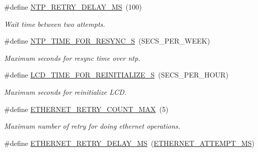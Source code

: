 \begin{DoxyCompactItemize}
\mbox{\label{rmap-config_8h_aee0934e91270bda3cc3fcaa9082fadc8}} 
\#define \hyperlink{rmap-config_8h_aee0934e91270bda3cc3fcaa9082fadc8}{N\+T\+P\+\_\+\+R\+E\+T\+R\+Y\+\_\+\+D\+E\+L\+A\+Y\+\_\+\+MS}~(100)
\begin{DoxyCompactList}\small\item\em Wait time between two attempts. \end{DoxyCompactList}\item 
\mbox{\label{rmap-config_8h_ac26c9e27fc41a5f7c43968b47b2d8cfc}} 
\#define \hyperlink{rmap-config_8h_ac26c9e27fc41a5f7c43968b47b2d8cfc}{N\+T\+P\+\_\+\+T\+I\+M\+E\+\_\+\+F\+O\+R\+\_\+\+R\+E\+S\+Y\+N\+C\+\_\+S}~(S\+E\+C\+S\+\_\+\+P\+E\+R\+\_\+\+W\+E\+EK)
\begin{DoxyCompactList}\small\item\em Maximum seconds for resync time over ntp. \end{DoxyCompactList}\item 
\mbox{\label{rmap-config_8h_af546d356bff5c682bba4aeeed199d5df}} 
\#define \hyperlink{rmap-config_8h_af546d356bff5c682bba4aeeed199d5df}{L\+C\+D\+\_\+\+T\+I\+M\+E\+\_\+\+F\+O\+R\+\_\+\+R\+E\+I\+N\+I\+T\+I\+A\+L\+I\+Z\+E\+\_\+S}~(S\+E\+C\+S\+\_\+\+P\+E\+R\+\_\+\+H\+O\+UR)
\begin{DoxyCompactList}\small\item\em Maximum seconds for reinitialize L\+CD. \end{DoxyCompactList}\item 
\mbox{\label{rmap-config_8h_a743e7905c81f2b5b6bb32fc55a3c5494}} 
\#define \hyperlink{rmap-config_8h_a743e7905c81f2b5b6bb32fc55a3c5494}{E\+T\+H\+E\+R\+N\+E\+T\+\_\+\+R\+E\+T\+R\+Y\+\_\+\+C\+O\+U\+N\+T\+\_\+\+M\+AX}~(5)
\begin{DoxyCompactList}\small\item\em Maximum number of retry for doing ethernet operations. \end{DoxyCompactList}\item 
\mbox{\label{rmap-config_8h_aad84a5cc78471bbe08ae9b0f519866ea}} 
\#define \hyperlink{rmap-config_8h_aad84a5cc78471bbe08ae9b0f519866ea}{E\+T\+H\+E\+R\+N\+E\+T\+\_\+\+R\+E\+T\+R\+Y\+\_\+\+D\+E\+L\+A\+Y\+\_\+\+MS}~(\hyperlink{ethernet__config_8h_a33ddf6002b3cabe6872997f10ce52a3b}{E\+T\+H\+E\+R\+N\+E\+T\+\_\+\+A\+T\+T\+E\+M\+P\+T\+\_\+\+MS})

\end{DoxyCompactItemize}
